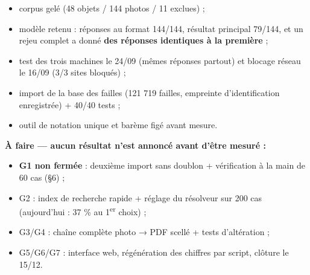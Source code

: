 \documentclass[11pt,a4paper]{article}
\begin{document}
\begin{itemize}  \item corpus gelé (48 objets / 144 photos / 11 exclues) ;
\end{itemize}

\begin{itemize}  \item modèle retenu : réponses au format 144/144, résultat principal 79/144, et un rejeu complet a donné \textbf{des réponses identiques à la première} ;
\end{itemize}

\begin{itemize}  \item test des trois machines le 24/09 (mêmes réponses partout) et blocage réseau le 16/09 (3/3 sites bloqués) ;
\end{itemize}

\begin{itemize}  \item import de la base des failles (121 719 failles, empreinte d'identification enregistrée) + 40/40 tests ;
\end{itemize}

\begin{itemize}  \item outil de notation unique et barème figé avant mesure.
\end{itemize}

\textbf{À faire — aucun résultat n'est annoncé avant d'être mesuré :}

\begin{itemize}  \item \textbf{G1 non fermée} : deuxième import sans doublon + vérification à la main de 60 cas (§6) ;
\end{itemize}

\begin{itemize}  \item G2 : index de recherche rapide + réglage du résolveur sur 200 cas (aujourd'hui : 37 \% au 1\textsuperscript{er} choix) ;
\end{itemize}

\begin{itemize}  \item G3/G4 : chaîne complète photo → PDF scellé + tests d'altération ;
\end{itemize}

\begin{itemize}  \item G5/G6/G7 : interface web, régénération des chiffres par script, clôture le 15/12.
\end{itemize}
\end{document}
